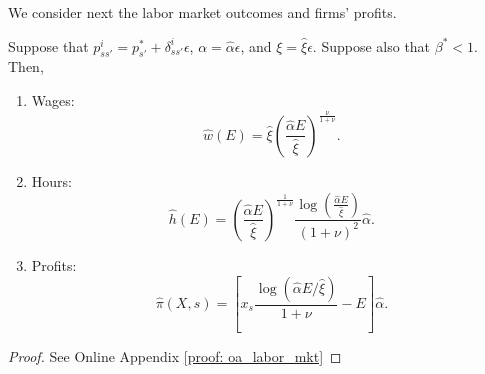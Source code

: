 We consider next the labor market outcomes and firms'  profits. 
\begin{proposition}\label{oa_labor_mkt} Suppose that $p_{ss'}^i = p_{s'}^* + \delta_{ss'}^i \epsilon$, $\alpha = \hat{\alpha} \epsilon$, and $\xi = \hat{\xi} \epsilon$. Suppose also that $\beta^* < 1$. Then,
\begin{enumerate}
    \item Wages:
\begin{equation}
    \hat{w}(E) = \hat{\xi}\left( \frac{\hat{\alpha} E}{\hat{\xi}} \right)^{\frac{\nu}{1+\nu}}.
\end{equation}

\item Hours:
\begin{equation}
    \hat{h}(E) = \left( \frac{\hat{\alpha} E}{\hat{\xi}} \right)^{\frac{1}{1+\nu}} \frac{\log \left( \frac{\hat{\alpha} E}{\hat{\xi}} \right)}{(1+\nu)^2} \hat{\alpha}.
\end{equation}

\item Profits:
\begin{equation}
    \hat{\pi}(X,s) = \left[ x_s \frac{\log \left( \hat{\alpha} E/   \hat{\xi} \right)}{1+\nu} -E \right] \hat{\alpha}.
\end{equation}
\end{enumerate}
\end{proposition}
\begin{proof}
See Online Appendix \ref{proof: oa_labor_mkt}
\end{proof}

